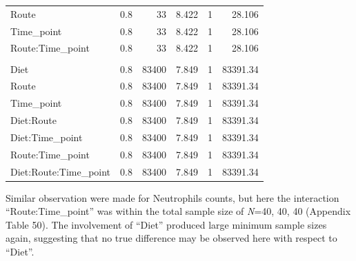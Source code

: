 \documentclass[
  12pt,
  letterpaper,
]{article}
\begin{document}
\begin{longtable}{l|rrrrr}
\midrule\addlinespace[2.5pt]
\multicolumn{6}{l}{Route:Time\_point} \\[2.5pt] 
\midrule\addlinespace[2.5pt]
Route & 0.8 & 33 & 8.422 & 1 & 28.106 \\ 
Time\_point & 0.8 & 33 & 8.422 & 1 & 28.106 \\ 
Route:Time\_point & 0.8 & 33 & 8.422 & 1 & 28.106 \\ 
\midrule\addlinespace[2.5pt]
\multicolumn{6}{l}{Diet:Route:Time\_point} \\[2.5pt] 
\midrule\addlinespace[2.5pt]
Diet & 0.8 & 83400 & 7.849 & 1 & 83391.34 \\ 
Route & 0.8 & 83400 & 7.849 & 1 & 83391.34 \\ 
Time\_point & 0.8 & 83400 & 7.849 & 1 & 83391.34 \\ 
Diet:Route & 0.8 & 83400 & 7.849 & 1 & 83391.34 \\ 
Diet:Time\_point & 0.8 & 83400 & 7.849 & 1 & 83391.34 \\ 
Route:Time\_point & 0.8 & 83400 & 7.849 & 1 & 83391.34 \\ 
Diet:Route:Time\_point & 0.8 & 83400 & 7.849 & 1 & 83391.34 \\ 
\bottomrule
\end{longtable}
\endgroup

Similar observation were made for Neutrophils counts, but here the interaction ``Route:Time\_point'' was within the total sample size of \emph{N}=40, 40, 40 (Appendix Table 50). The involvement of ``Diet'' produced large minimum sample sizes again, suggesting that no true difference may be observed here with respect to ``Diet''.
\end{document}
